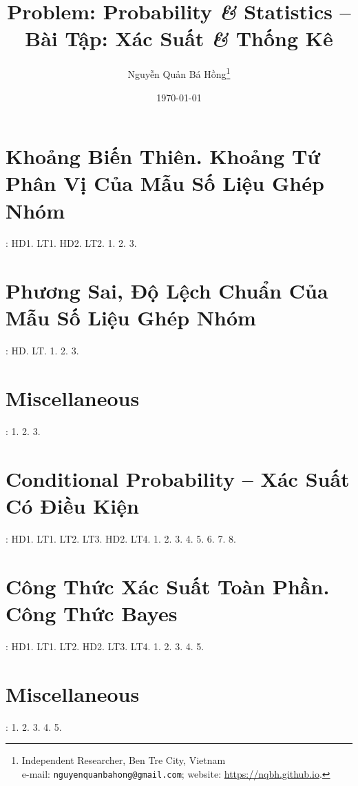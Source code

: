 \documentclass{article}
\title{Problem: Probability {\it\&} Statistics -- Bài Tập: Xác Suất {\it\&} Thống Kê}
\author{Nguyễn Quản Bá Hồng\footnote{Independent Researcher, Ben Tre City, Vietnam\\e-mail: \texttt{nguyenquanbahong@gmail.com}; website: \url{https://nqbh.github.io}.}}
\date{\today}
\begin{document}
\maketitle
\tableofcontents


\section{Khoảng Biến Thiên. Khoảng Tứ Phân Vị Của Mẫu Số Liệu Ghép Nhóm}
\cite[Chap. III, \S1, pp. 84--88]{SGK_Toan_12_Canh_Dieu_tap_1}: HD1. LT1. HD2. LT2. 1. 2. 3.


\section{Phương Sai, Độ Lệch Chuẩn Của Mẫu Số Liệu Ghép Nhóm}
\cite[Chap. III, \S2, pp. 84--88]{SGK_Toan_12_Canh_Dieu_tap_1}: HD. LT. 1. 2. 3.


\section{Miscellaneous}
\cite[BTCCIII, p. 93]{SGK_Toan_12_Canh_Dieu_tap_1}: 1. 2. 3.


\section{Conditional Probability -- Xác Suất Có Điều Kiện}
\cite[Chap. VI, \S1, pp. 90--96]{SGK_Toan_12_Canh_Dieu_tap_2}: HD1. LT1. LT2. LT3. HD2. LT4. 1. 2. 3. 4. 5. 6. 7. 8.


\section{Công Thức Xác Suất Toàn Phần. Công Thức Bayes}
\cite[Chap. VI, \S2, pp. 97--102]{SGK_Toan_12_Canh_Dieu_tap_2}: HD1. LT1. LT2. HD2. LT3. LT4. 1. 2. 3. 4. 5.


\section{Miscellaneous}
\cite[BTCCVI, p. 103]{SGK_Toan_12_Canh_Dieu_tap_2}: 1. 2. 3. 4. 5.


\printbibliography[heading=bibintoc]
	
\end{document}
